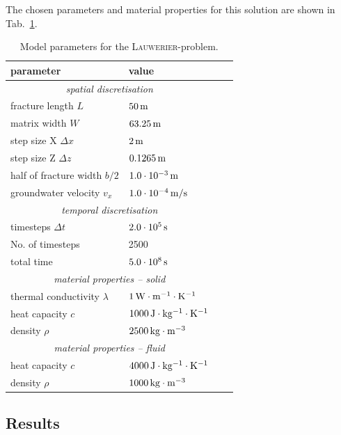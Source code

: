 The chosen parameters and material properties for this solution are shown in Tab.~\ref{tab-lauwerier-parameters}.
\begin{table}[ht]
\caption{\label{tab-lauwerier-parameters}Model parameters for the \textsc{Lauwerier}-problem.}
\begin{center}
\begin{tabular}{llll}
\toprule
parameter 						& value \\
\midrule
\multicolumn{2}{c}{\textit{spatial discretisation}} \\
fracture length $L$				& $\unit[50]{m}$  \\
matrix width $W$ 				& $\unit[63.25]{m}$  \\
step size X $\Delta x$ 			& $\unit[2]{m}$  \\
step size Z $\Delta z$ 			& $\unit[0.1265]{m}$  \\
half of fracture width $b/2$ 	& $\unit[1.0 \cdot 10^{-3}]{m}$  \\
groundwater velocity $v_x$ 		& $\unit[1.0 \cdot 10^{-4}]{m/s}$ \\
\cmidrule{1-4}
\multicolumn{2}{c}{\textit{temporal discretisation}}\\
timesteps $\Delta t$ 			& $\unit[2.0 \cdot 10^{5}]{s}$  \\ 
No. of timesteps 				& 2500 \\
total time 						& $\unit[5.0 \cdot 10^{8}]{s}$  \\
\cmidrule{1-4}
\multicolumn{2}{c}{\textit{material properties -- solid}}\\
thermal conductivity $\lambda$ 	& $\unit[1]{W \cdot m^{-1} \cdot K^{-1}}$  \\
heat capacity $c$ 				& $\unit[1000]{J \cdot kg^{-1} \cdot K^{-1}}$  \\
density $\rho$ 					& $\unit[2500]{kg \cdot m^{-3}}$  \\
\cmidrule{1-4}
\multicolumn{2}{c}{\textit{material properties -- fluid}}\\
heat capacity $c$ 				& $\unit[4000]{J \cdot kg^{-1} \cdot K^{-1}}$  \\
density $\rho$ 					& $\unit[1000]{kg \cdot m^{-3}}$  \\
\bottomrule
\end{tabular}
\end{center}
\end{table}

\subsection{Results}

